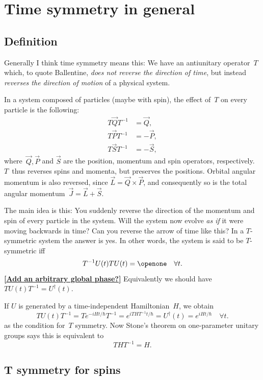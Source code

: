 \documentclass[aps,pra,12pt,nofootinbib,superscriptaddress,longbibliography,showpacs]{revtex4-1}
\newcommand{\todo}[1]{\textbf{\underline{\textcolor{dblue}{\textbf{[}#1\textbf{]}}}}}
\theoremstyle{plain}
\theoremstyle{definition}
\newcommand{\I}{\openone}     %
\newcommand{\be}{\begin{equation}}
\newcommand{\ee}{\end{equation}}
\begin{document}
\section{Time symmetry in general}

\subsection{Definition}
Generally I think time symmetry means this: We have an antiunitary
operator~$T$ which, to quote Ballentine, \emph{does not reverse the direction of time},
but instead \emph{reverses the direction of motion} of a physical system.

In a system composed of particles (maybe with spin), the effect of~$T$
on every particle is the following:
\begin{align}
T\vec{Q}T^{-1} &= \vec{Q},\\
T\vec{P}T^{-1} &= -\vec{P},\\
T\vec{S}T^{-1} &= -\vec{S},
\end{align}
where~$\vec{Q}, \vec{P}$ and $\vec{S}$ are the position, momentum and
spin operators, respectively.
$T$~thus reverses spins and momenta, but preserves the positions.
Orbital angular momentum is also reversed, since
$\vec{L} = \vec{Q} \times \vec{P}$, and consequently so is the total
angular momentum~$\vec{J} = \vec{L} + \vec{S}$.

The main idea is this: You suddenly reverse the direction of the
momentum and spin of every particle in the system. Will the system now
evolve \emph{as if} it were moving backwards in time? Can you reverse
the arrow of time like this? In a $T$-symmetric system the answer is yes.
In other words, the system is said to be $T$-symmetric iff
\be
T^{-1} U(t) T U(t) = \I \quad \forall t.
\ee
\todo{Add an arbitrary global phase?}
Equivalently we should have~$T U(t) T^{-1} = U^\dagger(t)$.

If $U$ is generated by a time-independent Hamiltonian~$H$, we obtain
\be
T U(t) T^{-1} 
= T e^{-i H t/\hbar} T^{-1} 
= e^{i THT^{-1} t/\hbar}  
= U^\dagger(t)
= e^{i H t/\hbar} \quad \forall t.
\ee
as the condition for~$T$ symmetry. Now Stone's theorem on
one-parameter unitary groups says this is equivalent to
\be
T H T^{-1} = H.
\ee



\subsection{T symmetry for spins}
\end{document}
